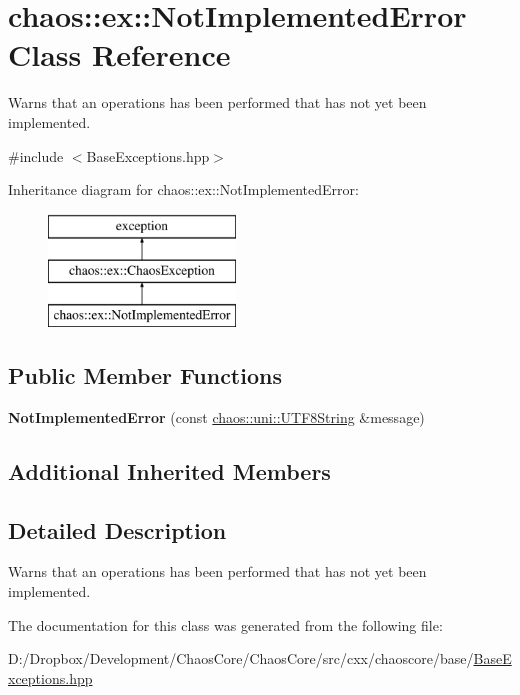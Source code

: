 \hypertarget{classchaos_1_1ex_1_1_not_implemented_error}{}\section{chaos\+:\+:ex\+:\+:Not\+Implemented\+Error Class Reference}
\label{classchaos_1_1ex_1_1_not_implemented_error}


Warns that an operations has been performed that has not yet been implemented.  




{\ttfamily \#include $<$Base\+Exceptions.\+hpp$>$}

Inheritance diagram for chaos\+:\+:ex\+:\+:Not\+Implemented\+Error\+:\begin{figure}[H]
\begin{center}
\leavevmode
\includegraphics[height=3.000000cm]{classchaos_1_1ex_1_1_not_implemented_error}
\end{center}
\end{figure}
\subsection*{Public Member Functions}
\begin{DoxyCompactItemize}
\item 
\hypertarget{classchaos_1_1ex_1_1_not_implemented_error_a2e51452c959e229dfc4f46fad6c4c15f}{}{\bfseries Not\+Implemented\+Error} (const \hyperlink{classchaos_1_1uni_1_1_u_t_f8_string}{chaos\+::uni\+::\+U\+T\+F8\+String} \&message)\label{classchaos_1_1ex_1_1_not_implemented_error_a2e51452c959e229dfc4f46fad6c4c15f}

\end{DoxyCompactItemize}
\subsection*{Additional Inherited Members}


\subsection{Detailed Description}
Warns that an operations has been performed that has not yet been implemented. 

The documentation for this class was generated from the following file\+:\begin{DoxyCompactItemize}
\item 
D\+:/\+Dropbox/\+Development/\+Chaos\+Core/\+Chaos\+Core/src/cxx/chaoscore/base/\hyperlink{_base_exceptions_8hpp}{Base\+Exceptions.\+hpp}\end{DoxyCompactItemize}
